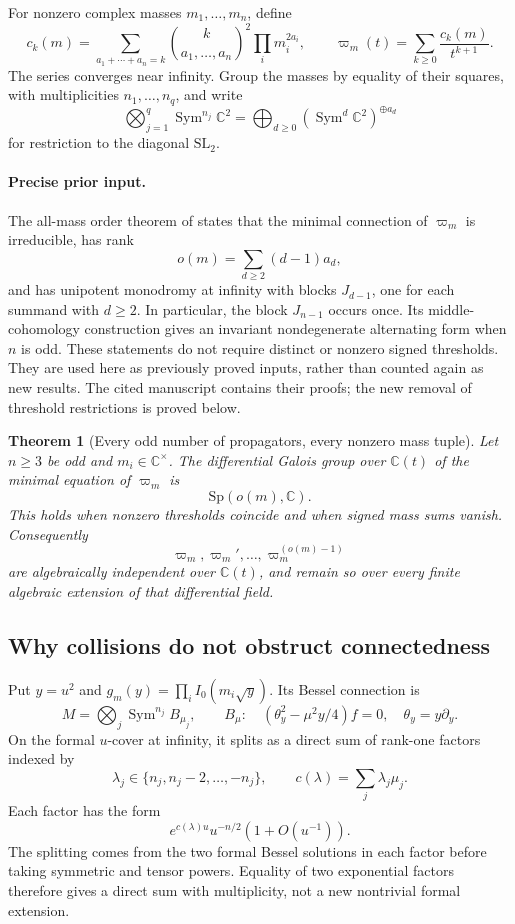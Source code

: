 \documentclass[11pt,a4paper]{article}
\newtheorem{theorem}{Theorem}[section]
\theoremstyle{definition}
\theoremstyle{remark}
\numberwithin{equation}{section}
\begin{document}
For nonzero complex masses $m_1,\ldots,m_n$, define
\[
 c_k(m)=\sum_{a_1+\cdots+a_n=k}
       \binom{k}{a_1,\ldots,a_n}^{\!2}\prod_i m_i^{2a_i},
 \qquad \varpi_m(t)=\sum_{k\ge0}\frac{c_k(m)}{t^{k+1}}.
\]
The series converges near infinity. Group the masses by equality of
their squares, with multiplicities $n_1,\ldots,n_q$, and write
\[
 \bigotimes_{j=1}^q\operatorname{Sym}^{n_j}\mathbb C^2
    =\bigoplus_{d\ge0}(\operatorname{Sym}^d\mathbb C^2)^{\oplus a_d}
\]
for restriction to the diagonal $\mathrm{SL}_2$.

\paragraph{Precise prior input.}
The all-mass order theorem of \cite{p5:Keio032} states that the minimal
connection of $\varpi_m$ is irreducible, has rank
\[
 o(m)=\sum_{d\ge2}(d-1)a_d,
\]
and has unipotent monodromy at infinity with blocks $J_{d-1}$,
one for each summand with $d\ge2$. In particular, the block $J_{n-1}$
occurs once. Its middle-cohomology construction gives an invariant
nondegenerate alternating form when $n$ is odd. These statements do
not require distinct or nonzero signed thresholds. They are used here
as previously proved inputs, rather than counted again as new results.
The cited manuscript contains their proofs; the new removal of threshold
restrictions is proved below.

\begin{theorem}[Every odd number of propagators, every nonzero mass tuple]
\label{p7:front:banana-main}
Let $n\ge3$ be odd and $m_i\in\mathbb C^\times$.
The differential Galois group over $\mathbb C(t)$ of the minimal
equation of $\varpi_m$ is
\[
                         \mathrm{Sp}(o(m),\mathbb C).
\]
This holds when nonzero thresholds coincide and when signed mass sums
vanish. Consequently
\[
 \varpi_m,\varpi_m',\ldots,\varpi_m^{(o(m)-1)}
\]
are algebraically independent over $\mathbb C(t)$, and remain so
over every finite algebraic extension of that differential field.
\end{theorem}

\subsection{Why collisions do not obstruct connectedness}

Put $y=u^2$ and
$g_m(y)=\prod_i I_0(m_i\sqrt y)$. Its Bessel connection is
\[
 M=\bigotimes_j\operatorname{Sym}^{n_j}B_{\mu_j},
 \qquad B_\mu:\quad (\theta_y^2-\mu^2y/4)f=0,
 \quad\theta_y=y\partial_y.
\]
On the formal $u$-cover at infinity, it splits as a direct sum of
rank-one factors indexed by
\[
 \lambda_j\in\{n_j,n_j-2,\ldots,-n_j\},\qquad
 c(\lambda)=\sum_j\lambda_j\mu_j.
\]
Each factor has the form
\[
          e^{c(\lambda)u}u^{-n/2}(1+O(u^{-1})).
\]
The splitting comes from the two formal Bessel solutions in each
factor before taking symmetric and tensor powers. Equality of two
exponential factors therefore gives a direct sum with multiplicity,
not a new nontrivial formal extension.
\end{document}
